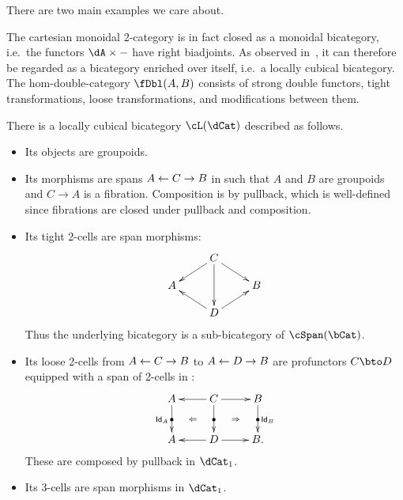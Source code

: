 \documentclass{amsart}
\newcommand{\hunit}[1]{\Id_{#1}}
\newcommand{\Id}{\mathsf{Id}}
\begin{document}
There are two main examples we care about.

\begin{eg}
  The cartesian monoidal 2-category \cDbl is in fact closed as a monoidal bicategory, i.e.\ the functors $\dA\times -$ have right biadjoints.
  As observed in~\cite{gg:lowdim-tricats}, it can therefore be regarded as a bicategory enriched over itself, i.e.\ a locally cubical bicategory.
  The hom-double-category $\fDbl(A,B)$ consists of strong double functors, tight transformations, loose transformations, and modifications between them.
\end{eg}

\begin{thm}
  There is a locally cubical bicategory $\cL(\dCat)$ described as follows.
  \begin{itemize}
  \item Its objects are groupoids.
  \item Its morphisms are spans $A \leftarrow C \to B$ in \bCat such that $A$ and $B$ are groupoids and $C\to A$ is a fibration.
    Composition is by pullback, which is well-defined since fibrations are closed under pullback and composition.
  \item Its tight 2-cells are span morphisms:
    \[ \xymatrix@R=1pc{ & C \ar[dl] \ar[dr] \ar[dd] \\ A && B \\ &D \ar[ul] \ar[ur] } \]
    Thus the underlying bicategory is a sub-bicategory of $\cSpan(\bCat)$.
  \item Its loose 2-cells from $A \leftarrow C \to B$ to $A\leftarrow D \to B$ are profunctors $C\bto D$ equipped with a span of 2-cells in \dCat:
    \[ \xymatrix{ A \ar[d]|{\bullet}_{\hunit A} \ar@{}[dr]|{\Leftarrow} &
      C \ar[l] \ar[d]|{\bullet} \ar[r] \ar@{}[dr]|{\Rightarrow} &
      B \ar[d]|{\bullet}^{\hunit B}\\
      A & D \ar[l] \ar[r] & B. } \]
    These are composed by pullback in $\dCat_1$.
  \item Its 3-cells are span morphisms in $\dCat_1$.
  \end{itemize}
\end{thm}
\end{document}
